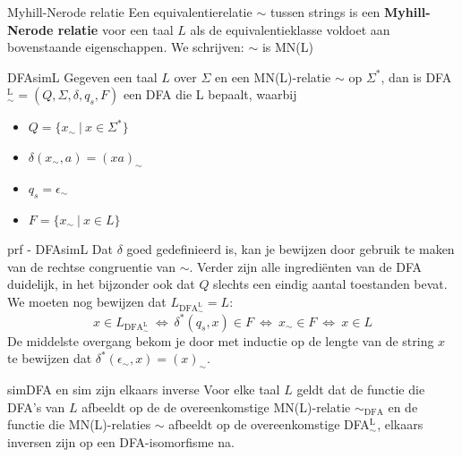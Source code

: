 \begin{theo}{Myhill-Nerode relatie}
    Een equivalentierelatie $\sim$ tussen strings is een \textbf{Myhill-Nerode relatie} voor een taal $L$ als de equivalentieklasse
    voldoet aan bovenstaande eigenschappen. We schrijven: $\sim$ is MN(L)
\end{theo}

\begin{lem}{DFAsimL}
    Gegeven een taal $L$ over $\Sigma$ en een MN(L)-relatie $\sim$ op $\Sigma^*$, dan is DFA$_{\sim}^{\text{L}} = (Q, \Sigma, \delta, q_s, F)$ een DFA die L bepaalt, waarbij
    \begin{itemize}
        \item $Q = \{x_{\sim} \ | \ x \in \Sigma^* \}$
        \item $\delta(x_{\sim},a) = (xa)_{\sim}$
        \item $q_s = \epsilon_{\sim}$
        \item $F = \{x_{\sim} \ | \ x \in L \}$
    \end{itemize}  
    \vspace{-0.3cm}
\end{lem}

\begin{prf}{prf - DFAsimL}
    Dat $\delta$ goed gedefinieerd is, kan je bewijzen door gebruik te maken van de rechtse congruentie van $\sim$.
    Verder zijn alle ingrediënten van de DFA duidelijk, in het bijzonder ook dat $Q$ slechts een eindig aantal toestanden bevat.
    We moeten nog bewijzen dat $L_{\text{DFA}_{\sim}^{\text{L}}} = L$:
    \begin{equation*}
        x \in L_{\text{DFA}_{\sim}^{\text{L}}} \ \Leftrightarrow \ \delta^*(q_s,x) \in F \ \Leftrightarrow \ x_{\sim} \in F \ \Leftrightarrow \ x \in L
    \end{equation*}
    De middelste overgang bekom je door met inductie op de lengte van de string $x$ te bewijzen dat $\delta^*(\epsilon_{\sim},x) = (x)_{\sim}$.
\end{prf}

\newpage

\begin{lem}{simDFA en sim zijn elkaars inverse}
    Voor elke taal $L$ geldt dat de functie die DFA's van $L$ afbeeldt op de de overeenkomstige MN(L)-relatie $\sim_{\text{DFA}}$ en de functie 
    die MN(L)-relaties $\sim$ afbeeldt op de overeenkomstige DFA$_{\sim}^{\text{L}}$, elkaars inversen zijn op een DFA-isomorfisme na.
\end{lem}

